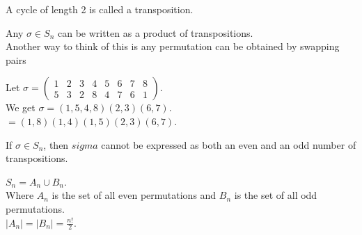 \begin{definition}
    A cycle of length 2 is called a transposition.\\
\end{definition}

\begin{theorem}
    Any $\sigma \in S_n$ can be written as a product of transpositions.\\
    Another way to think of this is any permutation can be obtained by swapping pairs
\end{theorem}

\begin{exercise}
    Let $\sigma = \begin{pmatrix}
        1 & 2 & 3 & 4 & 5 & 6 & 7 & 8 \\
        5 & 3 & 2 & 8 & 4 & 7 & 6 & 1
    \end{pmatrix}$.\\

    We get $\sigma = (1, 5, 4, 8)(2, 3)(6, 7)$.\\
    $ = (1, 8)(1, 4)(1, 5)(2, 3)(6, 7)$.\\
\end{exercise}

\begin{theorem}
If $\sigma \in S_n$, then $sigma$ cannot be expressed as both an even and an odd number of transpositions.\\
\end{theorem}

\begin{definition}
    $S_n = A_n \cup B_n$.\\
    Where $A_n$ is the set of all even permutations and $B_n$ is the set of all odd permutations.\\
    $|A_n| = |B_n| = \frac{n!}{2}$.\\
\end{definition}